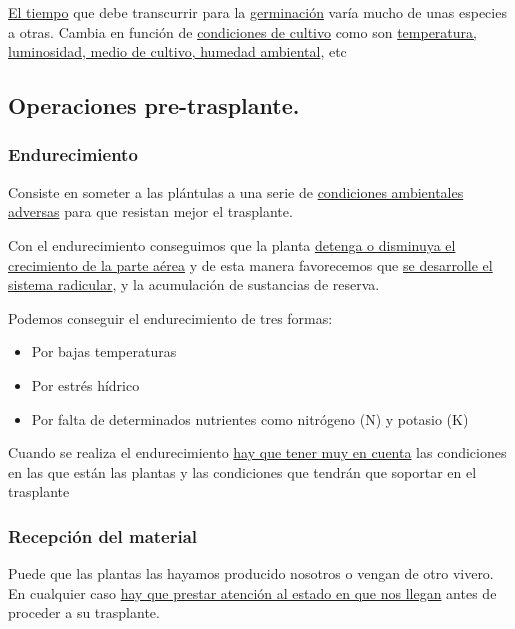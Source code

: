 \documentclass[a4paper,12pt,oneside]{article}
\begin{document}
\uline{El tiempo} que debe transcurrir para la \uline{germinación} varía mucho de unas
especies a otras. Cambia en función de \uline{condiciones de cultivo} como son
\uline{temperatura, luminosidad, medio de cultivo, humedad ambiental}, etc

\subsection{Operaciones pre-trasplante.}
\label{sec:orge8c4208}

\subsubsection{Endurecimiento}
\label{sec:org9af66f1}
Consiste en someter a las plántulas a una serie de \uline{condiciones ambientales
adversas} para que resistan  mejor el trasplante.

Con el  endurecimiento conseguimos que la planta \uline{detenga o disminuya el
crecimiento de la parte aérea} y de esta manera favorecemos que \uline{se desarrolle
el sistema radicular}, y la acumulación de sustancias de reserva. 

Podemos conseguir el endurecimiento de tres formas:
\begin{itemize}
\item Por bajas temperaturas
\item Por estrés hídrico
\item Por falta de determinados nutrientes como nitrógeno (N) y potasio (K)
\end{itemize}

Cuando se realiza el endurecimiento \uline{hay que tener muy en cuenta} las
condiciones en las que están las plantas y las condiciones que tendrán que
soportar en el trasplante
\subsubsection{Recepción del material}
\label{sec:org2e8fb94}
Puede que las plantas las hayamos producido nosotros o vengan de otro
vivero. En cualquier caso \uline{hay que prestar atención al estado en que nos
llegan} antes de proceder a su trasplante.
\end{document}
